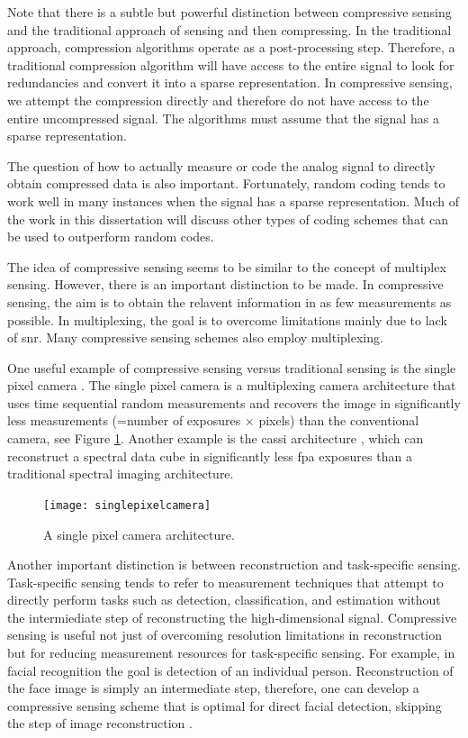 Note that there is a subtle but powerful distinction between compressive sensing and the traditional approach of sensing and then compressing. In the traditional approach, compression algorithms operate as a post-processing step. Therefore, a traditional compression algorithm will have access to the entire signal to look for redundancies and convert it into a sparse representation. In compressive sensing, we attempt the compression directly and therefore do not have access to the entire uncompressed signal. The algorithms must assume that the signal has a sparse representation. 

The question of how to actually measure or code the analog signal to directly obtain compressed data is also important. Fortunately, random coding tends to work well in many instances when the signal has a sparse representation. Much of the work in this dissertation will discuss other types of coding schemes that can be used to outperform random codes. 

The idea of compressive sensing seems to be similar to the concept of multiplex sensing. However, there is an important distinction to be made. In compressive sensing, the aim is to obtain the relavent information in as few measurements as possible. In multiplexing, the goal is to overcome limitations mainly due to lack of \gls{snr}. Many compressive sensing schemes also employ multiplexing.

One useful example of compressive sensing versus traditional sensing is the single pixel camera \cite{duarte2008single}. The single pixel camera is a multiplexing camera architecture that uses time sequential random measurements and recovers the image in significantly less measurements (=number of exposures $\times$ pixels) than the conventional camera, see Figure \ref{fig:singlepixelcamera}. Another example is the \gls{cassi} architecture \cite{wagadarikar2008single}, which can reconstruct a spectral data cube in significantly less \gls{fpa} exposures than a traditional spectral imaging architecture. 


\begin{figure}
    \centering
    \texttt{[image: singlepixelcamera]}
    \caption{A single pixel camera architecture.}
    \label{fig:singlepixelcamera}
\end{figure}

Another important distinction is between reconstruction and task-specific sensing. Task-specific sensing tends to refer to measurement techniques that attempt to directly perform tasks such as detection, classification, and estimation without the intermiediate step of reconstructing the high-dimensional signal. Compressive sensing is useful not just of overcoming resolution limitations in reconstruction but for reducing measurement resources for task-specific sensing. For example, in facial recognition the goal is detection of an individual person. Reconstruction of the face image is simply an intermediate step, therefore, one can develop a compressive sensing scheme that is optimal for direct facial detection, skipping the step of image reconstruction \cite{pal2005face}. 

